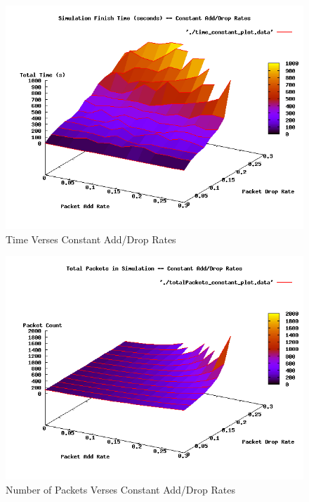 \documentclass{usenixsubmit}
\begin{document}
\begin{figure}
	\centering
		\includegraphics[scale=0.5]{./plots/time_constant_plot.png}
	\caption{Time Verses Constant Add/Drop Rates}
	\label{fig:timeplot}
\end{figure}
\begin{figure}
	\centering
		\includegraphics[scale=0.5]{./plots/totalPackets_constant_plot.png}
	\caption{Number of Packets Verses Constant Add/Drop Rates}
	\label{fig:countplot}
\end{figure}
\end{document}
